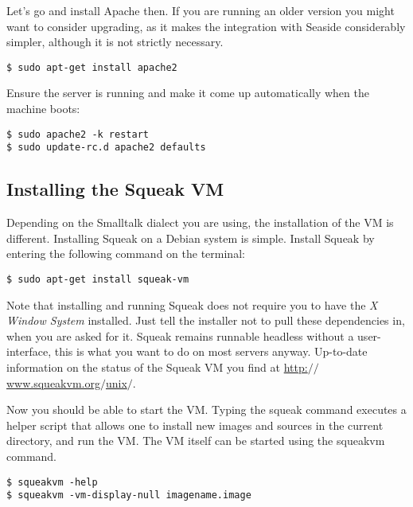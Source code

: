 \documentclass[a4paper,10pt,twoside]{book}
\newcommand{\ct}[1]{{\small\ttfamily\textup{#1}}}
\begin{document}
Let's go and install Apache then. If you are running an older version you might want to consider upgrading, as it makes the integration with Seaside considerably simpler, although it is not strictly necessary.

\begin{lstlisting}
$ sudo apt-get install apache2
\end{lstlisting}

Ensure the server is running and make it come up automatically when the machine boots:

\begin{lstlisting}
$ sudo apache2 -k restart
$ sudo update-rc.d apache2 defaults
\end{lstlisting}

\subsection{Installing the Squeak VM}
\label{book:advanced:deployment:deploymentapache:installvm}

Depending on the Smalltalk dialect you are using, the installation of 
the VM is different. Installing Squeak on a Debian system is simple. 
Install Squeak by entering the following command on the terminal: 

\begin{lstlisting}
$ sudo apt-get install squeak-vm
\end{lstlisting}

Note that installing and running Squeak does not require you to have the \textit{X Window System} installed. Just tell the installer not to pull these dependencies in, when you are asked for it. Squeak remains runnable headless without a user-interface, this is what you want to do on most servers anyway. Up-to-date information on the status of the Squeak VM you find at \href{http://www.squeakvm.org/unix/}{http:$/$$/$www.squeakvm.org$/$unix$/$}.

Now you should be able to start the VM. Typing the \ct{squeak} command executes a helper script that allows one to install new images and sources in the current directory, and run the VM. The VM itself can be started using the \ct{squeakvm} command.

\begin{lstlisting}
$ squeakvm -help
$ squeakvm -vm-display-null imagename.image
\end{lstlisting}
\end{document}
